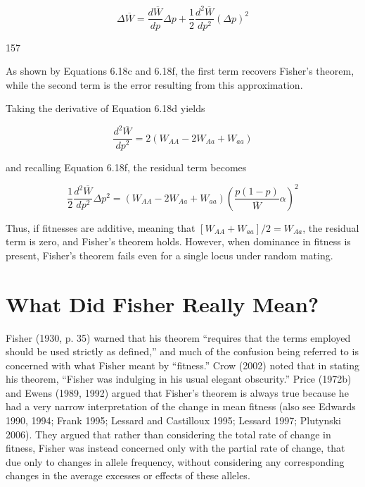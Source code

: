 \documentclass{article}
\begin{document}
\begin{equation}
\Delta\overline{W}=\frac{d\overline{W}}{d p}\Delta p+\frac{1}{2}\frac{d^{2}\overline{W}}{d p^{2}}\left(\Delta p\right)^{2}
\end{equation}

157

As shown by Equations 6.18c and 6.18f, the first term recovers Fisher's theorem, while the second term is the error resulting from this approximation.

Taking the derivative of Equation 6.18d yields

\begin{equation}
\frac{d^{2}\overline{W}}{d p^{2}}=2\left(W_{A A}-2W_{A a}+W_{a a}\right)
\end{equation}

and recalling Equation 6.18f, the residual term becomes

\begin{equation}
\frac{1}{2}\frac{d^{2}\overline{W}}{d p^{2}}\Delta p^{2}=\left(W_{A A}-2W_{A a}+W_{a a}\right)\left(\frac{p(1-p)}{\overline{W}}\alpha\right)^{2}
\end{equation}

Thus, if fitnesses are additive, meaning that  $ [W_{AA} + W_{aa}]/2 = W_{Aa} $, the residual term is zero, and Fisher's theorem holds. However, when dominance in fitness is present, Fisher's theorem fails even for a single locus under random mating.

\section{What Did Fisher Really Mean?}
Fisher (1930, p. 35) warned that his theorem “requires that the terms employed should be used strictly as defined,” and much of the confusion being referred to is concerned with what Fisher meant by “fitness.” Crow (2002) noted that in stating his theorem, “Fisher was indulging in his usual elegant obscurity.” Price (1972b) and Ewens (1989, 1992) argued that Fisher’s theorem is always true because he had a very narrow interpretation of the change in mean fitness (also see Edwards 1990, 1994; Frank 1995; Lessard and Castilloux 1995; Lessard 1997; Plutynski 2006). They argued that rather than considering the total rate of change in fitness, Fisher was instead concerned only with the partial rate of change, that due only to changes in allele frequency, without considering any corresponding changes in the average excesses or effects of these alleles.
\end{document}
